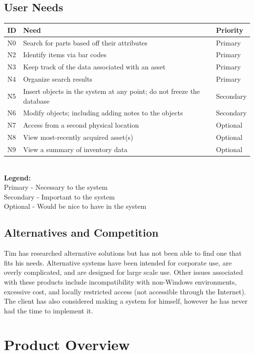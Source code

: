 \documentclass{article}
\begin{document}
\subsection{User Needs}
\begin{tabular}{ | p{0.15in} | p{4.0in} | p{.75in} |}
\hline
\textbf{ID} & \textbf{Need} & \textbf{Priority} \\
\hline
\hline
N0 & Search for parts based off their attributes & Primary \\
\hline
N2 & Identify items via bar codes & Primary \\
\hline
N3 & Keep track of the data associated with an asset & Primary \\
\hline
N4 & Organize search results & Primary \\
\hline
N5 & Insert objects in the system at any point; do not freeze the database & Secondary \\
\hline
N6 & Modify objects; including adding notes to the objects & Secondary \\
\hline
N7 & Access from a second physical location & Optional \\
\hline
N8 & View most-recently acquired asset(s) & Optional \\
\hline
N9 & View a summary of inventory data & Optional \\
\hline
\end{tabular} \\
\textbf{Legend:} \\
Primary - Necessary to the system \\
Secondary - Important to the system \\
Optional - Would be nice to have in the system

\subsection{Alternatives and Competition}
Tim has researched alternative solutions but has not been able to find one that fits his needs.  Alternative systems have been intended for corporate use, are overly complicated, and are designed for large scale use.  Other issues associated with these products include incompatibility with non-Windows environments, excessive cost, and locally restricted access (not accessible through the Internet).  The client has also considered making a system for himself, however he has never had the time to implement it.

\section{Product Overview}
\end{document}

